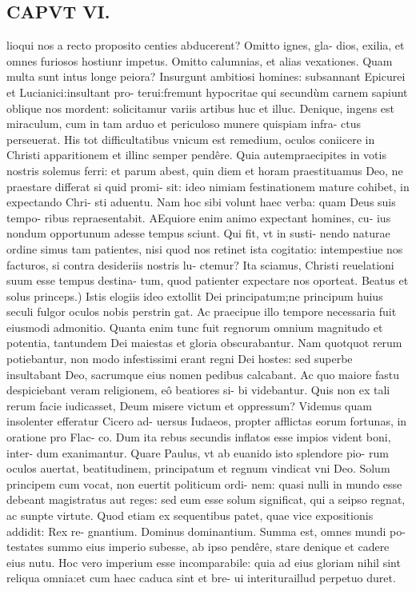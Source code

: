 \documentclass{article}
\begin{document}
\begin{pages}
\section*{CAPVT VI. }
\marginpar{[ p.81 ]}\pstart lioqui nos a recto proposito centies abducerent? Omitto ignes, gla- dios, exilia, et omnes furiosos hostiunr impetus. Omitto calumnias, et alias vexationes. Quam multa sunt intus longe peiora? Insurgunt ambitiosi homines: subsannant Epicurei et Lucianici:insultant pro- terui:fremunt hypocritae qui secundùm carnem sapiunt oblique nos mordent: solicitamur variis artibus huc et illuc. Denique, ingens est miraculum, cum in tam arduo et periculoso munere quispiam infra- ctus perseuerat. His tot difficultatibus vnicum est remedium, oculos coniicere in Christi apparitionem et illinc semper pendêre. Quia autempraecipites in votis nostris solemus ferri: et parum abest, quin diem et horam praestituamus Deo, ne praestare differat si quid promi- sit: ideo nimiam festinationem mature cohibet, in expectando Chri- sti aduentu. Nam hoc sibi volunt haec verba: quam Deus suis tempo- ribus repraesentabit. AEquiore enim animo expectant homines, cu- ius nondum opportunum adesse tempus sciunt. Qui fit, vt in susti- nendo naturae ordine simus tam patientes, nisi quod nos retinet ista cogitatio: intempestiue nos facturos, si contra desideriis nostris lu- ctemur? Ita sciamus, Christi reuelationi suum esse tempus destina- tum, quod patienter expectare nos oporteat.  \pend\pstart Beatus et solus princeps.) Istis elogiis ideo extollit Dei principatum;ne principum huius seculi fulgor oculos nobis perstrin gat. Ac praecipue illo tempore necessaria fuit eiusmodi admonitio. Quanta enim tunc fuit regnorum omnium magnitudo et potentia, tantundem Dei maiestas et gloria obscurabantur. Nam quotquot rerum potiebantur, non modo infestissimi erant regni Dei hostes: sed superbe insultabant Deo, sacrumque eius nomen pedibus calcabant. Ac quo maiore fastu despiciebant veram religionem, eô beatiores si- bi videbantur. Quis non ex tali rerum facie iudicasset, Deum misere victum et oppressum? Videmus quam insolenter efferatur Cicero ad- uersus Iudaeos, propter afflictas eorum fortunas, in oratione pro Flac- co. Dum ita rebus secundis inflatos esse impios vident boni, inter- dum exanimantur. Quare Paulus, vt ab euanido isto splendore pio- rum oculos auertat, beatitudinem, principatum et regnum vindicat vni Deo. Solum principem cum vocat, non euertit politicum ordi- nem: quasi nulli in mundo esse debeant magistratus aut reges: sed eum esse solum significat, qui a seipso regnat, ac sunpte virtute. Quod etiam ex sequentibus patet, quae vice expositionis addidit: Rex re- gnantium. Dominus dominantium. Summa est, omnes mundi po- testates summo eius imperio subesse, ab ipso pendêre, stare denique et cadere eius nutu. Hoc vero imperium esse incomparabile: quia ad eius gloriam nihil sint reliqua omnia:et cum haec caduca sint et bre- ui interituraillud perpetuo duret.  \pend

\end{pages}
\end{document}
